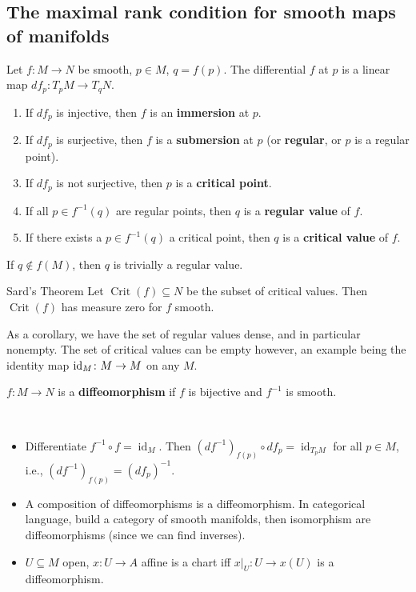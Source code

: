 \subsection{The maximal rank condition for smooth maps of manifolds}
\begin{definition}[]
    Let $f \colon M \to N$ be smooth, $p \in M$, $q=f(p)$. The differential $f$ at $p$ is a linear map $df_p \colon T_pM \to T_qN$.
    \begin{enumerate}[label=(\roman*)]
        \item If $df_p$ is injective, then $f$ is an \textbf{immersion} at $p$.
        \item If $df_p$ is surjective, then $f$ is a \textbf{submersion} at $p$ (or \textbf{regular}, or $p$ is a regular point).
        \item If $df_p$ is not surjective, then $p$ is a \textbf{critical point}.
        \item If all $p \in f^{-1}(q)$ are regular points, then $q$ is a \textbf{regular value} of $f$.
        \item If there exists a $p \in f^{-1}(q)$ a critical point, then $q$ is a \textbf{critical value} of $f$.
    \end{enumerate}
\end{definition}
\begin{remark}
    If $q \notin f(M)$, then $q$ is trivially a regular value.
\end{remark}

\begin{namedthm}{Sard's Theorem}
    Let $\operatorname{Crit}(f) \subseteq N$ be the subset of critical values. Then $\operatorname{Crit}(f)$ has measure zero for $f$ smooth.
\end{namedthm}
As a corollary, we have the set of regular values dense, and in particular nonempty. The set of critical values can be empty however, an example being the identity map $\operatorname{id}_M \colon M \to M$ on any $M$.
\begin{definition}[]
    $f \colon M \to N$ is a \textbf{diffeomorphism} if $f$ is bijective and $f ^{-1}$ is smooth.
\end{definition}
\begin{remark}\,
    \begin{itemize}
        \item Differentiate $f^{-1} \circ f=\operatorname{id}_M$. Then $(df^{-1})_{f(p)}\circ df_p= \operatorname{id}_{T_pM}$ for all $p \in M$, i.e., $(df^{-1})_{f(p)}=(df_p)^{-1}$. 
        \item A composition of diffeomorphisms is a diffeomorphism. In categorical language, build a category of smooth manifolds, then isomorphism are diffeomorphisms (since we can find inverses).
        \item $U \subseteq M$ open, $x \colon U \to A$ affine is a chart iff $x|_U \colon U \to x(U)$ is a diffeomorphism.
    \end{itemize}
\end{remark}


